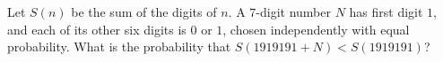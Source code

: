 Let $S(n)$ be the sum of the digits of $n$. A $7$-digit number $N$ has first digit $1$, and each of its other six digits is $0$ or $1$, chosen independently with equal probability. What is the probability that $S(1919191+N)<S(1919191)$?
